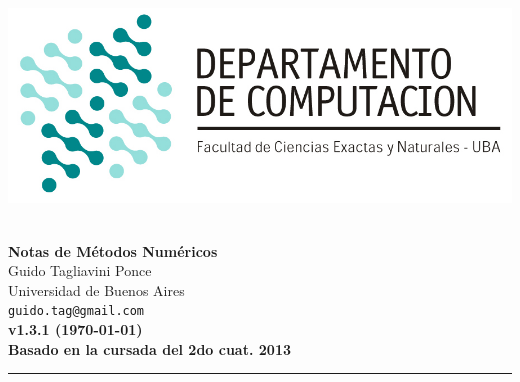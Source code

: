 \hfill \includegraphics[scale = 0.75]{imagenes/logo_dc.jpg}~\\[0.25cm]

\begin{center}
	\textbf{\Large Notas de Métodos Numéricos}\\[1cm]
	{\large Guido Tagliavini Ponce\\[0.15cm]}
	Universidad de Buenos Aires\\[0.15cm]
	\texttt{guido.tag@gmail.com}\\[1cm]
	\textbf{v1.3.1 (\today)}\\[0.25cm]
	\textbf{Basado en la cursada del 2do cuat. 2013}\\[1cm]
\end{center}
\rule{\linewidth}{0.2mm}
